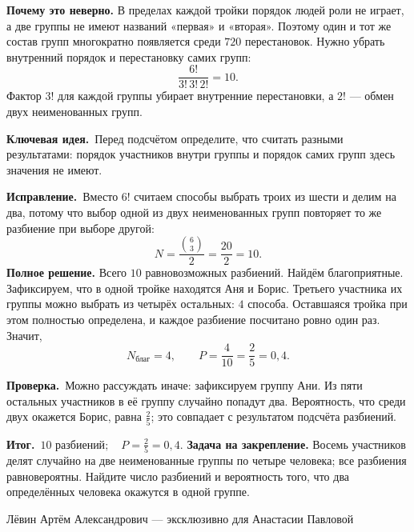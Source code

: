 \documentclass[a4paper,12pt]{article}
\newcommand{\keylabel}{\textcolor{accent}{\textbf{Ключевая идея.}}}
\newcommand{\resultlabel}{\textcolor{accent}{\textbf{Итог.}}}
\newcommand{\fix}{\textbf{Исправление.}}
\newcommand{\verify}{\textbf{Проверка.}}
\newcommand{\practice}{\medskip\textbf{Задача на закрепление.} }
\begin{document}
\textbf{Почему это неверно.} В пределах каждой тройки порядок людей роли не играет, а две группы не имеют названий «первая» и «вторая». Поэтому один и тот же состав групп многократно появляется среди $720$ перестановок. Нужно убрать внутренний порядок и перестановку самих групп:
\[
\frac{6!}{3!\,3!\,2!}=10.
\]
Фактор $3!$ для каждой группы убирает внутренние перестановки, а $2!$ --- обмен двух неименованных групп.

\keylabel\ Перед подсчётом определите, что считать разными результатами: порядок участников внутри группы и порядок самих групп здесь значения не имеют.

\fix\ Вместо $6!$ считаем способы выбрать троих из шести и делим на два, потому что выбор одной из двух неименованных групп повторяет то же разбиение при выборе другой:
\[
N=\frac{\binom63}{2}=\frac{20}{2}=10.
\]
\textbf{Полное решение.} Всего $10$ равновозможных разбиений. Найдём благоприятные. Зафиксируем, что в одной тройке находятся Аня и Борис. Третьего участника их группы можно выбрать из четырёх остальных: $4$ способа. Оставшаяся тройка при этом полностью определена, и каждое разбиение посчитано ровно один раз. Значит,
\[
N_{\text{благ}}=4,\qquad P=\frac4{10}=\frac25=0{,}4.
\]

\verify\ Можно рассуждать иначе: зафиксируем группу Ани. Из пяти остальных участников в её группу случайно попадут два. Вероятность, что среди двух окажется Борис, равна $\frac25$; это совпадает с результатом подсчёта разбиений.

\resultlabel\ $\boxed{10\text{ разбиений};\quad P=\frac25=0{,}4}$.
\practice Восемь участников делят случайно на две неименованные группы по четыре человека; все разбиения равновероятны. Найдите число разбиений и вероятность того, что два определённых человека окажутся в одной группе.

\vfill
\begin{center}\small\color{muted} Лёвин Артём Александрович --- эксклюзивно для Анастасии Павловой\end{center}
\end{document}
